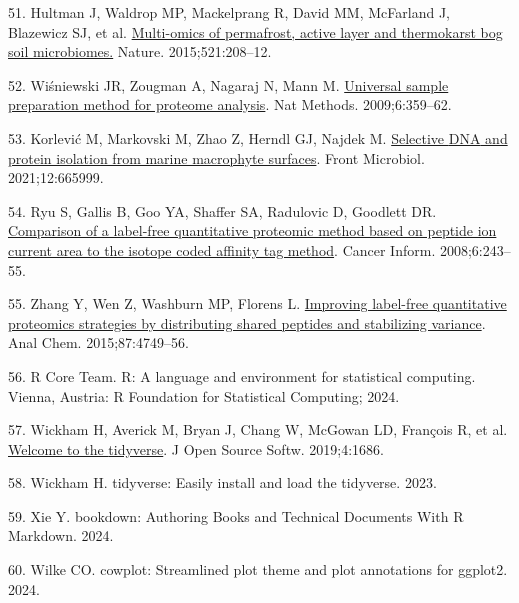 \documentclass[
  12 pt,
]{article}
\newlength{\cslhangindent}
\newlength{\cslentryspacingunit} %
\newenvironment{CSLReferences}[2] %
 {%
  \setlength{\parindent}{0pt}
  \ifodd #1
  \let\oldpar\par
  \def\par{\hangindent=\cslhangindent\oldpar}
  \fi
  \setlength{\parskip}{#2\cslentryspacingunit}
 }%
 {}
\begin{document}
\begin{CSLReferences}{0}{0}
\leavevmode{}%
51. Hultman J, Waldrop MP, Mackelprang R, David MM, McFarland J, Blazewicz SJ, et al. \href{https://doi.org/10.1038/nature14238}{Multi-omics of permafrost, active layer and thermokarst bog soil microbiomes.} Nature. 2015;521:208--12.

\leavevmode{}%
52. Wiśniewski JR, Zougman A, Nagaraj N, Mann M. \href{https://doi.org/10.1038/nmeth.1322}{Universal sample preparation method for proteome analysis}. Nat Methods. 2009;6:359--62.

\leavevmode{}%
53. Korlević M, Markovski M, Zhao Z, Herndl GJ, Najdek M. \href{https://doi.org/10.3389/fmicb.2021.665999}{Selective {DNA} and protein isolation from marine macrophyte surfaces}. Front Microbiol. 2021;12:665999.

\leavevmode{}%
54. Ryu S, Gallis B, Goo YA, Shaffer SA, Radulovic D, Goodlett DR. \href{https://doi.org/10.4137/CIN.S385}{Comparison of a label-free quantitative proteomic method based on peptide ion current area to the isotope coded affinity tag method}. Cancer Inform. 2008;6:243--55.

\leavevmode{}%
55. Zhang Y, Wen Z, Washburn MP, Florens L. \href{https://doi.org/10.1021/ac504740p}{Improving label-free quantitative proteomics strategies by distributing shared peptides and stabilizing variance}. Anal Chem. 2015;87:4749--56.

\leavevmode{}%
56. R Core Team. R: A language and environment for statistical computing. Vienna, Austria: R Foundation for Statistical Computing; 2024.

\leavevmode{}%
57. Wickham H, Averick M, Bryan J, Chang W, McGowan LD, François R, et al. \href{https://doi.org/10.21105/joss.01686}{Welcome to the {tidyverse}}. J Open Source Softw. 2019;4:1686.

\leavevmode{}%
58. Wickham H. {tidyverse}: Easily install and load the tidyverse. 2023.

\leavevmode{}%
59. Xie Y. {{bookdown}: Authoring Books and Technical Documents With {R} {Markdown}}. 2024.

\leavevmode{}%
60. Wilke CO. {cowplot}: Streamlined plot theme and plot annotations for ggplot2. 2024.


\end{CSLReferences}
\end{document}
